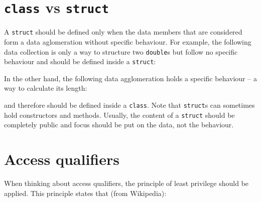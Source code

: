 %
%

%
%
%
%

\section{\texttt{class} vs \texttt{struct}}
A \texttt{struct} should be defined only when the data members that are 
considered form a data aglomeration without specific behaviour. For example, 
the following data collection is only a way to structure two \texttt{double}s 
but follow no specific behaviour and should be defined inside a \texttt{struct}:


In the other hand, the following data agglomeration holds a specific behaviour 
-- a way to calculate its length:


and therefore should be defined inside a \texttt{class}. Note that 
\texttt{struct}s can sometimes hold constructors and methods. Usually, the 
content of a \texttt{struct} should be completely public and focus should 
be put on the data, not the behaviour.

\section{Access qualifiers}
When thinking about access qualifiers, the principle of least privilege should 
be applied. This principle states that (from Wikipedia):

